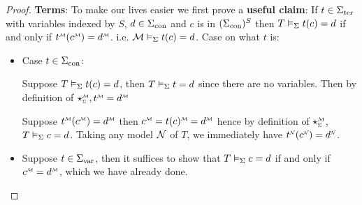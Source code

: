 \begin{proof}
    \textbf{Terms}:
    To make our lives easier we first prove a 
    \textbf{useful claim}:
    If $t \in {\Sigma}_\mathrm{ter}$ with variables indexed by $S$,
    $d \in {\Sigma}_\mathrm{con}$ and
    $c$ is in $({\Sigma}_\mathrm{con})^S$
    then $T \vDash_{\Sigma} t(c) = d$ 
    if and only if $\mmintp{t}(\mmintp{c}) = \mmintp{d}$.
    i.e. $\mathcal{M} \vDash_{\Sigma} t(c) = d$.
    Case on what $t$ is:
    \begin{itemize}
        \item Case $t \in {\Sigma}_\mathrm{con}$:
        \begin{forward} 
            Suppose $T \vDash_{\Sigma} t(c) = d$,
            then $T \vDash_{\Sigma} t = d$ 
            since there are no variables.
            Then by definition of $\intp{\Si}{\MM}, 
            \mmintp{t} = \mmintp{d}$
        \end{forward}
        \begin{backward} 
            Suppose $\mmintp{t}(\mmintp{c}) = \mmintp{d}$
            then $\mmintp{c} = \mmintp{t(c)} = \mmintp{d}$
            hence by definition of $\intp{\Si}{\MM}$,
            $T \vDash_{\Sigma} c = d$. 
            Taking any model $\mathcal{N}$ of $T$, 
            we immediately have $\nnintp{t}(\nnintp{c}) = \nnintp{d}$.
        \end{backward}
        \item Suppose $t \in {\Sigma}_\mathrm{var}$,
        then it suffices to show that $T \vDash_{\Sigma} c = d$ 
        if and only if $\mmintp{c} = \mmintp{d}$, 
        which we have already done.
        

\end{itemize}
\end{proof}
